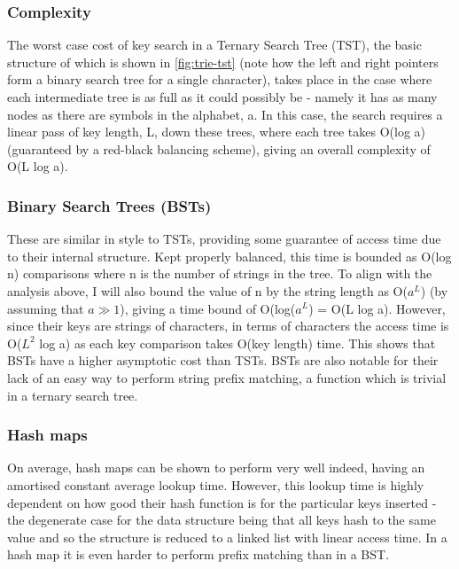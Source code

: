 \documentclass[a4paper,12pt,twoside,openright]{report}
\begin{document}
	\subsubsection{Complexity}
	
	The worst case cost of key search in a Ternary Search Tree (TST), the basic structure of which is shown in \figurename{ \ref{fig:trie-tst}} (note how the left and right pointers form a binary search tree for a single character), takes place in the case where each intermediate tree is as full as it could possibly be - namely it has as many nodes as there are symbols in the alphabet, a. In this case, the search requires a linear pass of key length, L, down these trees, where each tree takes O(log a) (guaranteed by a red-black balancing scheme), giving an overall complexity of O(L log a).
	
	\subsubsection{Binary Search Trees (BSTs)}
	
	These are similar in style to TSTs, providing some guarantee of access time due to their internal structure. Kept properly balanced, this time is bounded as O(log n) comparisons where n is the number of strings in the tree. To align with the analysis above, I will also bound the value of n by the string length as O($a^{L}$) (by assuming that $a \gg 1$), giving a time bound of O(log($a^{L}$) = O(L log a). However, since their keys are strings of characters, in terms of characters the access time is O($L^{2}$ log a) as each key comparison takes O(key length) time. This shows that BSTs have a higher asymptotic cost than TSTs. BSTs are also notable for their lack of an easy way to perform string prefix matching, a function which is trivial in a ternary search tree.
	
	\subsubsection{Hash maps}
	
	On average, hash maps can be shown to perform very well indeed, having an amortised constant average lookup time. However, this lookup time is highly dependent on how good their hash function is for the particular keys inserted - the degenerate case for the data structure being that all keys hash to the same value and so the structure is reduced to a linked list with linear access time. In a hash map it is even harder to perform prefix matching than in a BST.
	
\end{document}
